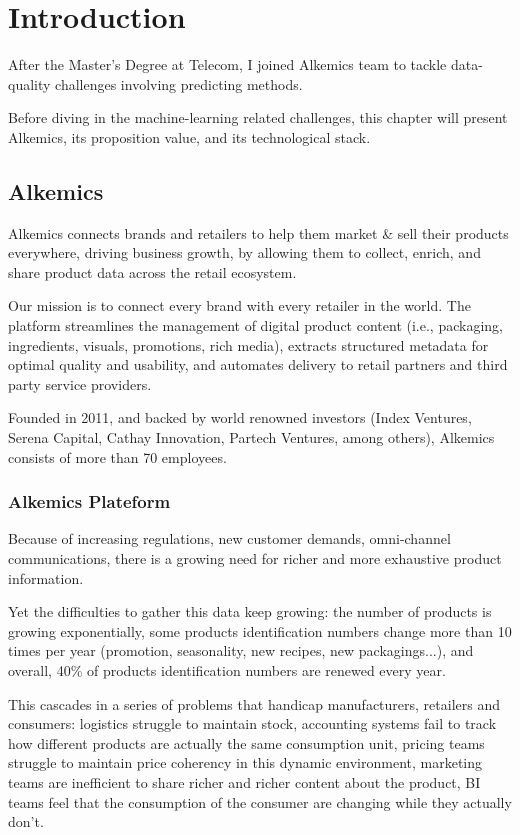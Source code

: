 \chapter{Introduction}

After the Master's Degree at Telecom, I joined Alkemics team to tackle data-quality challenges involving predicting methods. 

Before diving in the machine-learning related challenges, this chapter will present Alkemics, its proposition value, and its technological stack.

\section{Alkemics}


Alkemics connects brands and retailers to help them market \& sell their products everywhere, driving business growth, by allowing them to collect, enrich, and share product data across the retail ecosystem.

Our mission is to connect every brand with every retailer in the world. The platform streamlines the management of digital product content (i.e., packaging, ingredients, visuals, promotions, rich media), extracts structured metadata for optimal quality and usability, and automates delivery to retail partners and third party service providers.

Founded in 2011, and backed by world renowned investors (Index Ventures, Serena Capital, Cathay Innovation, Partech Ventures, among others), Alkemics consists of more than 70 employees.


\subsection{Alkemics Plateform}

Because of increasing regulations, new customer demands, omni-channel communications, there is a growing need for richer and more exhaustive product information. 

Yet the difficulties to gather this data keep growing: the number of products is growing exponentially, some products identification numbers change more than 10 times per year (promotion, seasonality, new recipes, new packagings...), and overall, 40\% of products identification numbers are renewed every year.

This cascades in a series of problems that handicap manufacturers, retailers and consumers: logistics struggle to maintain stock, accounting systems fail to track how different products are actually the same consumption unit, pricing teams struggle to maintain price coherency in this dynamic environment, marketing teams are inefficient to share richer and richer content about the product, BI teams feel that the consumption of the consumer are changing while they actually don't. 

